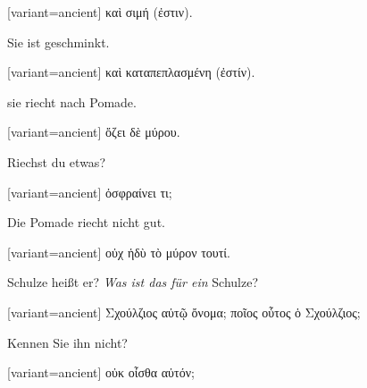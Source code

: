 \switchcolumn

\begin{greek}[variant=ancient]%
καὶ σιμή (ἐστιν).

\end{greek}%
\switchcolumn*

Sie ist geschminkt. 

\switchcolumn

\begin{greek}[variant=ancient]%
καὶ καταπεπλασμένη (ἐστίν).

\end{greek}%
\switchcolumn*

sie riecht nach Pomade. 

\switchcolumn

\begin{greek}[variant=ancient]%
ὄζει δὲ μύρου.

\end{greek}%
\switchcolumn*

Riechst du etwas? 

\switchcolumn

\begin{greek}[variant=ancient]%
ὀσφραίνει τι;

\end{greek}%
\switchcolumn*

Die Pomade riecht nicht gut. 

\switchcolumn

\begin{greek}[variant=ancient]%
οὐχ ἡδὺ τὸ μύρον τουτί.

\end{greek}%
Schulze heißt er? \emph{Was ist das für ein} Schulze? 

\switchcolumn

\begin{greek}[variant=ancient]%
Σχούλζιος αὐτῷ ὄνομα; ποῖος οὗτος ὁ Σχούλζιος;

\end{greek}%
\switchcolumn*

Kennen Sie ihn nicht? 

\switchcolumn

\begin{greek}[variant=ancient]%
οὐκ οἶσθα αὐτόν;

\end{greek}%
\switchcolumn*


